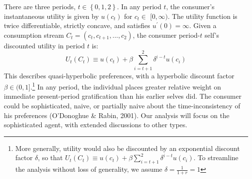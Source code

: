 \documentclass[11pt]{article}%
\begin{document}
There are three periods, $t\in\left\{  0,1,2\right\}  $. In any period $t$,
the consumer's instantaneous utility is given by $u\left(  c_{t}\right)  $ for
$c_{t}\in$ $[0,\infty)$. The utility function is twice differentiable,
strictly concave, and satisfies $u^{\prime}\left(  0\right)  =\infty$. Given a
consumption stream $C_{t}=\left(  c_{t},c_{t+1},...,c_{2}\right)  $,
the consumer period-$t$ self's discounted utility in period $t$ is:
\[
U_{t}\left(  C_{t}\right)  \equiv u\left(  c_{t}\right)  +\beta\sum
\limits_{i=t+1}^{2}\delta^{i-t}u\left(  c_{i}\right)
\]
This describes quasi-hyperbolic preferences, with a hyperbolic discount factor
$\beta\in(0,1]$.\footnote{More generally, utility would also be discounted by
an exponential discount factor $\delta$, so that $U_{t}\left(  C_{t}\right)
\equiv u\left(  c_{t}\right)  +\beta\sum\limits_{i=t+1}^{2}\delta
^{i-t}u\left(  c_{i}\right)  $. To streamline the analysis without loss of
generality, we assume $\delta=\frac{1}{1+r}=1$} In any period, the individual
places greater relative weight on immediate present-period gratification than
his earlier selves did. The consumer could be sophisticated, naive, or
partially naive about the time-inconsistency of his preferences (O'Donoghue \&
Rabin, 2001). Our analysis will focus on the sophisticated agent, with
extended discussions to other types.
\end{document}
